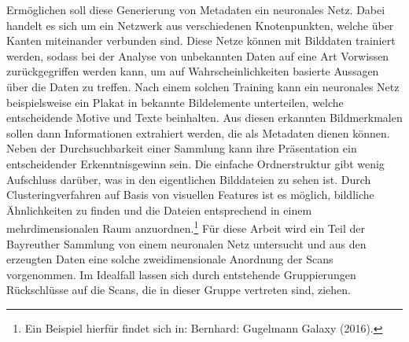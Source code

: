 \documentclass[a4paper,12pt,ngerman]{article}
\begin{document}
Ermöglichen soll diese Generierung von Metadaten ein neuronales Netz. Dabei handelt es sich um ein Netzwerk aus verschiedenen Knotenpunkten, welche über Kanten miteinander verbunden sind. Diese Netze können mit Bilddaten trainiert werden, sodass bei der Analyse von unbekannten Daten auf eine Art Vorwissen zurückgegriffen werden kann, um auf Wahrscheinlichkeiten basierte Aussagen über die Daten zu treffen. Nach einem solchen Training kann ein neuronales Netz beispielsweise ein Plakat in bekannte Bildelemente unterteilen, welche entscheidende Motive und Texte beinhalten. Aus diesen erkannten Bildmerkmalen sollen dann Informationen extrahiert werden, die als Metadaten dienen können. \\
Neben der Durchsuchbarkeit einer Sammlung kann ihre Präsentation ein entscheidender Erkenntnisgewinn sein. Die einfache Ordnerstruktur gibt wenig Aufschluss darüber, was in den eigentlichen Bilddateien zu sehen ist. Durch Clusteringverfahren auf Basis von visuellen Features ist es möglich, bildliche Ähnlichkeiten zu finden und die Dateien entsprechend in einem mehrdimensionalen Raum anzuordnen.\footnote{Ein Beispiel hierfür findet sich in: Bernhard: Gugelmann Galaxy (2016).} Für diese Arbeit wird ein Teil der Bayreuther Sammlung von einem neuronalen Netz untersucht und aus den erzeugten Daten eine solche zweidimensionale Anordnung der Scans vorgenommen. Im Idealfall lassen sich durch entstehende Gruppierungen Rückschlüsse auf die Scans, die in dieser Gruppe vertreten sind, ziehen.\\
\end{document}
